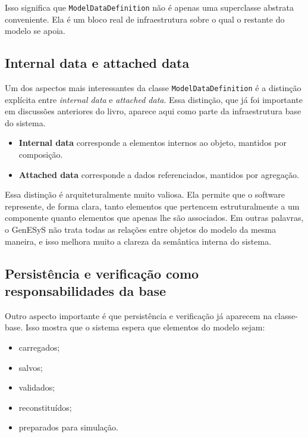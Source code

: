 Isso significa que \texttt{ModelDataDefinition} não é apenas uma superclasse abstrata conveniente. Ela é um bloco real de infraestrutura sobre o qual o restante do modelo se apoia.

\subsection{Internal data e attached data}
\label{subsec:cap8_internal_attached_data}

Um dos aspectos mais interessantes da classe \texttt{ModelDataDefinition} é a distinção explícita entre \textit{internal data} e \textit{attached data}. Essa distinção, que já foi importante em discussões anteriores do livro, aparece aqui como parte da infraestrutura base do sistema.

\begin{itemize}
    \item \textbf{Internal data} corresponde a elementos internos ao objeto, mantidos por composição.
    \item \textbf{Attached data} corresponde a dados referenciados, mantidos por agregação.
\end{itemize}

Essa distinção é arquiteturalmente muito valiosa. Ela permite que o software represente, de forma clara, tanto elementos que pertencem estruturalmente a um componente quanto elementos que apenas lhe são associados. Em outras palavras, o GenESyS não trata todas as relações entre objetos do modelo da mesma maneira, e isso melhora muito a clareza da semântica interna do sistema.

\subsection{Persistência e verificação como responsabilidades da base}
\label{subsec:cap8_persistencia_verificacao_base}

Outro aspecto importante é que persistência e verificação já aparecem na classe-base. Isso mostra que o sistema espera que elementos do modelo sejam:
\begin{itemize}
    \item carregados;
    \item salvos;
    \item validados;
    \item reconstituídos;
    \item preparados para simulação.
\end{itemize}

